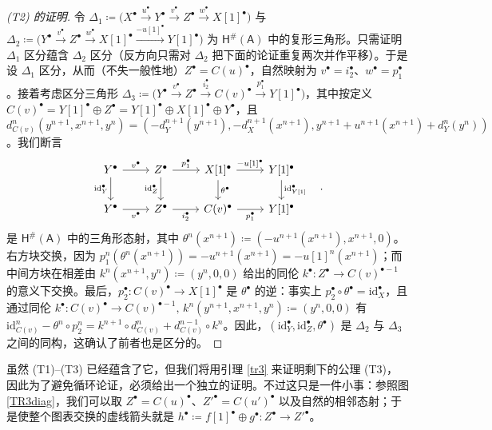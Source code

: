 \begin{proof}[(\textup{T2}) 的证明]
	令 $\Delta_1\coloneqq\big(X^\bullet\xrightarrow{u^\bullet} Y^\bullet\xrightarrow{v^\bullet} Z^\bullet\xrightarrow{w^\bullet} X[1]^\bullet\big)$ 与 $\Delta_2\coloneqq\big(Y^\bullet\xrightarrow{v^\bullet} Z^\bullet\xrightarrow{w^\bullet} X[1]^\bullet\xrightarrow{-u[1]^\bullet}Y[1]^\bullet\big)$ 为 $\mathsf{H^\#\!(A)}$ 中的复形三角形。只需证明 $\Delta_1$ 区分蕴含 $\Delta_2$ 区分（反方向只需对 $\Delta_2$ 把下面的论证重复两次并作平移）。于是设 $\Delta_1$ 区分，从而（不失一般性地）$Z^\bullet=C(u)^\bullet$，自然映射为 $v^\bullet=i_2^\bullet$、$w^\bullet=p_1^\bullet$。接着考虑区分三角形 $\Delta_3\coloneqq\big(Y^\bullet\xrightarrow{v^\bullet} Z^\bullet\xrightarrow{i_2^\bullet} C(v)^\bullet\xrightarrow{p_1^\bullet}Y[1]^\bullet\big)$，其中按定义 $C(v)^\bullet=Y[1]^\bullet\oplus Z^\bullet=Y[1]^\bullet\oplus X[1]^\bullet\oplus Y^\bullet$，且 $d_{C(v)}^n(y^{n+1},x^{n+1},y^n)=(-d_Y^{n+1}(y^{n+1}),-d_X^{n+1}(x^{n+1}), y^{n+1}+u^{n+1}(x^{n+1})+d_Y^n(y^n))$。我们断言
	\[
	\begin{tikzcd}
		Y^\bullet\arrow[r, "v^\bullet"]\arrow[d, "\text{id}_Y^\bullet"'] & Z^\bullet\arrow[r, "p_1^\bullet"]\arrow[d, "\text{id}_Z^\bullet"'] & X[1]^\bullet\arrow[r, "{-u[1]^\bullet}"]\arrow[d, "\theta^\bullet"] & Y[1]^\bullet\arrow[d, "\text{id}_{Y[1]}^\bullet"] \\
		Y^\bullet\arrow[r, "v^\bullet"'] & Z^\bullet\arrow[r, "i_2^\bullet"'] & C(v)^\bullet\arrow[r, "p_1^\bullet"'] & Y[1]^\bullet
	\end{tikzcd}\quad.
	\]
	是 $\mathsf{H^\#\!(A)}$ 中的三角形态射，其中 $\theta^n(x^{n+1})\coloneqq(-u^{n+1}(x^{n+1}),x^{n+1},0)$。右方块交换，因为 $p_1^n(\theta^n(x^{n+1}))=-u^{n+1}(x^{n+1})=-u[1]^n(x^{n+1})$；而中间方块在相差由 $k^n(x^{n+1},y^n)\coloneqq(y^n,0,0)$ 给出的同伦 $k^\bullet:Z^\bullet\rightarrow C(v)^{\bullet-1}$ 的意义下交换。最后，$p_2^\bullet:C(v)^\bullet\rightarrow X[1]^\bullet$ 是 $\theta^\bullet$ 的逆：事实上 $p_2^\bullet\circ\theta^\bullet=\text{id}_X^\bullet$，且通过同伦 $k^\bullet:C(v)^\bullet\rightarrow C(v)^{\bullet-1},\, k^n(y^{n+1},x^{n+1},y^n)\coloneqq(y^n,0,0)$ 有 $\text{id}_{C(v)}^n - \theta^n\circ p_2^n =k^{n+1}\circ d_{C(v)}^n+d_{C(v)}^{n-1}\circ k^n$。因此，$(\text{id}_Y^\bullet,\text{id}_Z^\bullet,\theta^\bullet)$ 是 $\Delta_2$ 与 $\Delta_3$ 之间的同构，这确认了前者也是区分的。
\end{proof}

\begin{Rem}
	虽然 (T1)--(T3) 已经蕴含了它，但我们将用引理 \ref{tr3} 来证明剩下的公理 (T3)，因此为了避免循环论证，必须给出一个独立的证明。不过这只是一件小事：参照图 \eqref{TR3diag}，我们可以取 $Z^\bullet=C(u)^\bullet$、$Z'^\bullet=C(u')^\bullet$ 以及自然的相邻态射；于是使整个图表交换的虚线箭头就是 $h^\bullet\coloneqq f[1]^\bullet \oplus g^\bullet:Z^\bullet\rightarrow Z'^\bullet$。
\end{Rem}

